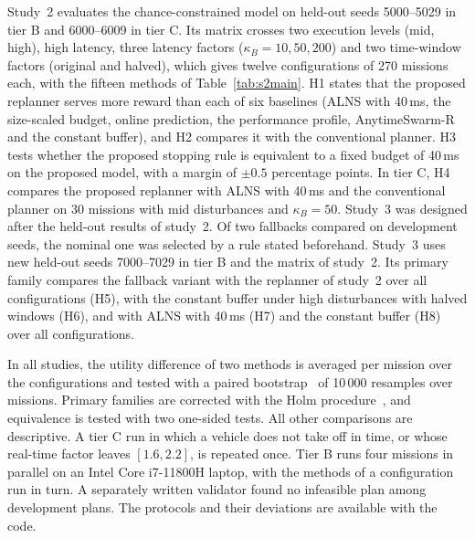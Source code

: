 Study~2 evaluates the chance-constrained model on held-out seeds 5000--5029 in tier B and 6000--6009 in tier C. Its
matrix crosses two execution levels (mid, high), high latency, three latency factors ($\kappa_B=10, 50, 200$) and two
time-window factors (original and halved), which gives twelve configurations of 270 missions each, with the fifteen
methods of Table~\ref{tab:s2main}. H1 states that the proposed replanner serves more reward than each of six baselines
(ALNS with 40\,ms, the size-scaled budget, online prediction, the performance profile, AnytimeSwarm-R and the constant
buffer), and H2 compares it with the conventional planner. H3 tests whether the proposed stopping rule is equivalent to
a fixed budget of 40\,ms on the proposed model, with a margin of $\pm0.5$ percentage points. In tier C, H4 compares the
proposed replanner with ALNS with 40\,ms and the conventional planner on 30 missions with mid disturbances and
$\kappa_B=50$. Study~3 was designed after the held-out results of study~2. Of two fallbacks compared on development
seeds, the nominal one was selected by a rule stated beforehand. Study~3 uses new held-out seeds 7000--7029 in tier B
and the matrix of study~2. Its primary family compares the fallback variant with the replanner of study~2 over all
configurations (H5), with the constant buffer under high disturbances with halved windows (H6), and with ALNS with
40\,ms (H7) and the constant buffer (H8) over all configurations.

In all studies, the utility difference of two methods is averaged per mission over the configurations and tested with a
paired bootstrap~\cite{efron1993bootstrap} of 10\,000 resamples over missions. Primary families are corrected with the
Holm procedure~\cite{holm1979simple}, and equivalence is tested with two one-sided tests. All other comparisons are
descriptive. A tier C run in which a vehicle does not take off in time, or whose real-time factor leaves $[1.6, 2.2]$,
is repeated once. Tier B runs four missions in parallel on an Intel Core i7-11800H laptop, with the methods of a
configuration run in turn. A separately written validator found no infeasible plan among 
development plans. The protocols and their deviations are available with the code.

